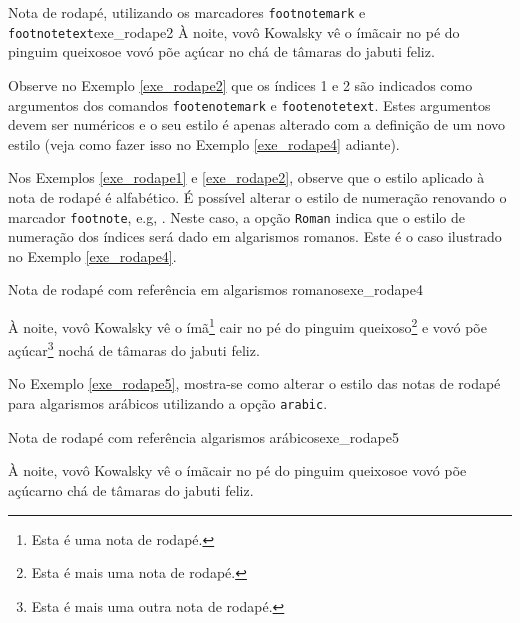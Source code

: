 
\begingroup
\renewcommand*{\thefootnote}{\alph{footnote}}
\begin{texexptitled}[breakable,enhanced,middle=2mm]{Nota de rodapé, utilizando os marcadores {\tt footnotemark} e {\tt footnotetext}}{exe_rodape2}
À noite, vovô Kowalsky vê o ímã\footnotemark[1] cair no pé do pinguim queixoso\footnotemark[2] e vovó põe açúcar no chá de tâmaras do jabuti feliz.

\end{texexptitled}
\endgroup

Observe no Exemplo \ref{exe_rodape2} que os índices 1 e 2 são indicados como argumentos dos comandos {\tt footenotemark} e {\tt footenotetext}. Estes argumentos devem ser numéricos e o seu estilo é apenas alterado com a definição de um novo estilo (veja como fazer isso no Exemplo \ref{exe_rodape4} adiante).

Nos Exemplos \ref{exe_rodape1} e \ref{exe_rodape2}, observe que o estilo aplicado à nota de rodapé é alfabético. É possível alterar o estilo de numeração renovando o marcador {\tt footnote}, e.g, \texttt{\renewcommand{\thefootnote}{\roman{footnote}}}. Neste caso, a opção {\tt Roman} indica que o estilo de numeração dos índices será dado em algarismos romanos. Este é o caso ilustrado no Exemplo \ref{exe_rodape4}.

\begingroup
\renewcommand*{\thempfootnote}{\Roman{mpfootnote}}
\begin{texexptitled}[breakable,enhanced,middle=2mm]{Nota de rodapé com referência em algarismos romanos}{exe_rodape4}
\renewcommand{\thefootnote}{\Roman{footnote}}

À noite, vovô Kowalsky vê o ímã\footnote{Esta é uma nota de rodapé.} cair no pé do pinguim queixoso\footnote{Esta é mais uma nota de rodapé.} e vovó põe açúcar\footnote{Esta é mais uma outra nota de rodapé.} nochá de tâmaras do jabuti feliz.
\end{texexptitled}
\endgroup

No Exemplo \ref{exe_rodape5}, mostra-se como alterar o estilo das notas de rodapé para algarismos arábicos utilizando a opção {\tt arabic}.

\begingroup
\renewcommand{\thempfootnote}{\arabic{mpfootnote}}
\begin{texexptitled}[breakable,enhanced,middle=2mm]{Nota de rodapé com referência algarismos arábicos}{exe_rodape5}
\renewcommand*{\thefootnote}{\arabic{footnote}}

À noite, vovô Kowalsky vê o ímã\footnotemark[1] cair no pé do pinguim queixoso\footnotemark[2] e vovó põe açúcar\footnotemark[3] no chá de tâmaras do jabuti feliz.

\end{texexptitled}
\endgroup

